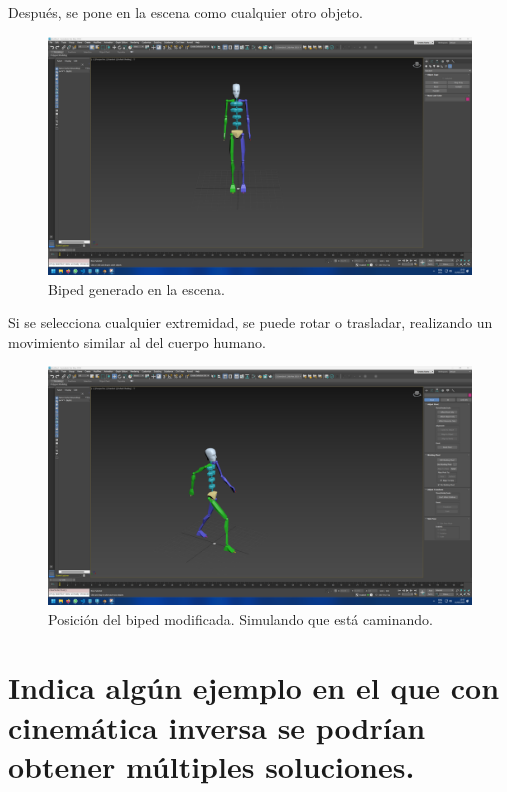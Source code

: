 \documentclass{article}
\begin{document}
Después, se pone en la escena como cualquier otro objeto.

\begin{figure}[H]
   \centering
   \includegraphics[width=\textwidth]{imagenes/biped.png}
   \caption{Biped generado en la escena.}
\end{figure}

Si se selecciona cualquier extremidad, se puede rotar o trasladar, realizando un movimiento similar al del cuerpo humano.

\begin{figure}[H]
   \centering
   \includegraphics[width=\textwidth]{imagenes/bipedWalk.png}
   \caption{Posición del biped modificada. Simulando que está caminando.}
\end{figure}

\section{Indica algún ejemplo en el que con cinemática inversa se podrían obtener múltiples soluciones.}
\end{document}
